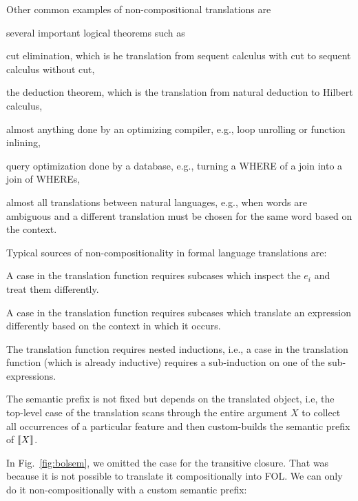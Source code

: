 Other common examples of non-compositional translations are
\begin{compactitem}
 \item several important logical theorems such as
  \begin{compactitem}
   \item cut elimination, which is he translation from sequent calculus with cut to sequent calculus without cut,
   \item the deduction theorem, which is the translation from natural deduction to Hilbert calculus,
  \end{compactitem}
 \item almost anything done by an optimizing compiler, e.g., loop unrolling or function inlining,
 \item query optimization done by a database, e.g., turning a WHERE of a join into a join of WHEREs,
 \item almost all translations between natural languages, e.g., when words are ambiguous and a different translation must be chosen for the same word based on the context.
\end{compactitem}

Typical sources of non-compositionality in formal language translations are:
\begin{compactitem}
 \item A case in the translation function requires subcases which inspect the $e_i$ and treat them differently.
 \item A case in the translation function requires subcases which translate an expression differently based on the context in which it occurs.
 \item The translation function requires nested inductions, i.e., a case in the translation function (which is already inductive) requires a sub-induction on one of the sub-expressions.
 \item The semantic prefix is not fixed but depends on the translated object, i.e, the top-level case of the translation scans through the entire argument $X$ to collect all occurrences of a particular feature and then custom-builds the semantic prefix of $\llbracket X\rrbracket$.
\end{compactitem}

In Fig.~\ref{fig:bolsem}, we omitted the case for the transitive closure.
That was because it is not possible to translate it compositionally into FOL.
We can only do it non-compositionally with a custom semantic prefix:

